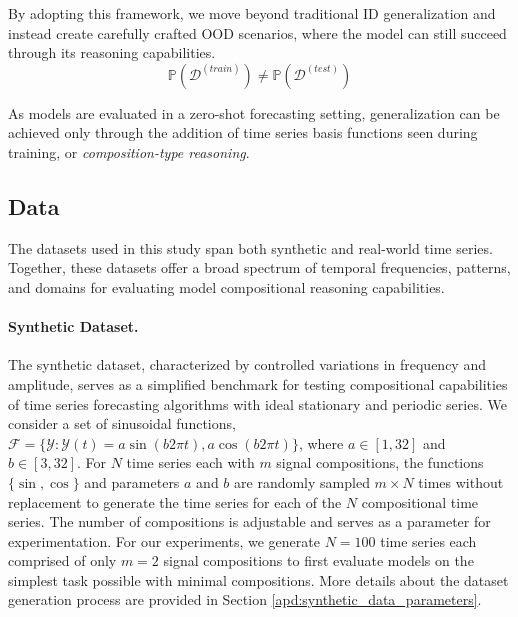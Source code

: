 By adopting this framework, we move beyond traditional ID generalization and instead create carefully crafted OOD scenarios, where the model can still succeed through its reasoning capabilities.
\begin{equation}
\mathbb{P}(\mathcal{D}^{(train)}) \neq \mathbb{P}(\mathcal{D}^{(test)})
\end{equation}

As models are evaluated in a zero-shot forecasting setting, generalization can be achieved only through the addition of time series basis functions seen during training, or \textit{composition-type reasoning}. 


\subsection{Data}\label{section:methods_data}
The datasets used in this study span both synthetic and real-world time series. Together, these datasets offer a broad spectrum of temporal frequencies, patterns, and domains for evaluating model compositional reasoning capabilities.

\paragraph{Synthetic Dataset.} 
The synthetic dataset, characterized by controlled variations in frequency and amplitude, serves as a simplified benchmark for testing compositional capabilities of time series forecasting algorithms with ideal stationary and periodic series. We consider a set of sinusoidal functions, $\mathcal{F} = \{\mathcal{Y} : \mathcal{Y}(t) = a\sin(b 2\pi t), a\cos(b 2\pi t)\}$, where $a \in [1, 32]$ and $b \in [3, 32]$. For $N$ time series each with $m$ signal compositions, the functions $\{\sin, \cos\}$ and parameters $a$ and $b$ are randomly sampled $m \times N$ times without replacement to generate the time series for each of the $N$ compositional time series. The number of compositions is adjustable and serves as a parameter for experimentation. For our experiments, we generate $N=100$ time series each comprised of only $m=2$ signal compositions to first evaluate models on the simplest task possible with minimal compositions. More details about the dataset generation process are provided in Section \ref{apd:synthetic_data_parameters}. 

